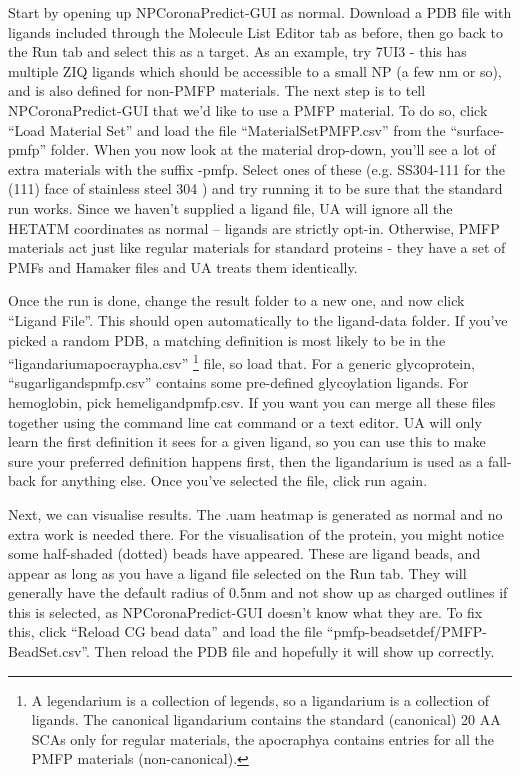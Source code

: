 \documentclass[10pt,a4paper,onecolumn]{report}
\begin{document}
Start by opening up NPCoronaPredict-GUI as normal. Download a PDB file with ligands included through the Molecule List Editor tab as before, then go back to the Run tab and select this as a target. As an example, try 7UI3 - this has multiple ZIQ ligands which should be accessible to a small NP (a few nm or so), and is also defined for non-PMFP materials.    The next step is to tell NPCoronaPredict-GUI that we'd like to use a PMFP material. To do so, click ``Load Material Set'' and load the file ``MaterialSetPMFP.csv'' from the ``surface-pmfp'' folder. When you now look at the material drop-down, you'll see a lot of extra materials with the suffix -pmfp. Select ones of these (e.g. SS304-111 for the (111) face of stainless steel 304 ) and try running it to be sure that the standard run works. Since we haven't supplied a ligand file, UA will ignore all the HETATM coordinates as normal -- ligands are strictly opt-in. Otherwise, PMFP materials act just like regular materials for standard proteins - they have a set of PMFs and Hamaker files and UA treats them identically. 

Once the run is done, change the result folder to a new one, and now click ``Ligand File''. This should open automatically to the ligand-data folder. If you've picked a random PDB, a matching definition is most likely to be in the ``ligandarium\textunderscore apocraypha.csv'' \footnote{A legendarium is a collection of legends, so a ligandarium is a collection of ligands. The canonical ligandarium contains the standard (canonical) 20 AA SCAs only for regular materials, the apocraphya contains entries for all the PMFP materials (non-canonical).} file, so load that. For a generic glycoprotein, ``sugarligands\textunderscore pmfp.csv'' contains some pre-defined glycoylation ligands. For hemoglobin, pick hemeligand\textunderscore pmfp.csv. If you want you can merge all these files together using the command line cat command or a text editor. UA will only learn the first definition it sees for a given ligand, so you can use this to make sure your preferred definition happens first, then the ligandarium is used as a fall-back for anything else.  Once you've selected the file, click run again.

Next, we can visualise results. The .uam heatmap is generated as normal and no extra work is needed there. For the visualisation of the protein, you might notice some half-shaded (dotted) beads have appeared. These are ligand beads, and appear as long as you have a ligand file selected on the Run tab. They will generally have the default radius of 0.5nm and not show up as charged outlines if this is selected, as NPCoronaPredict-GUI doesn't know what they are. To fix this, click ``Reload CG bead data'' and load the file ``pmfp-beadsetdef/PMFP-BeadSet.csv''. Then reload the PDB file and hopefully it will show up correctly. 
\end{document}
